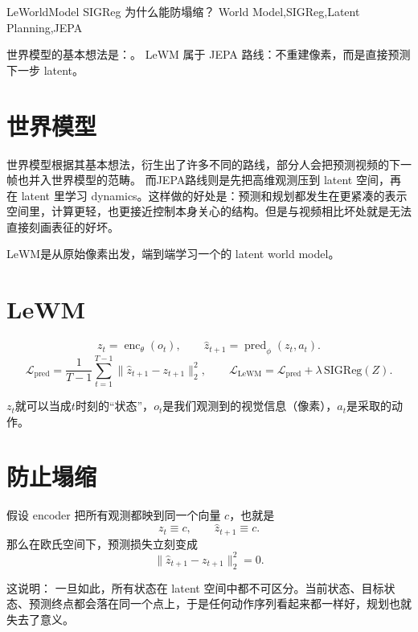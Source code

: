 \documentclass[12pt]{article}
\begin{document}
\MakeShortHeader
  {LeWorldModel}
  {SIGReg 为什么能防塌缩？}
  {World Model,SIGReg,Latent Planning,JEPA}

\begin{KeyBox}
世界模型的基本想法是：。  
LeWM 属于 JEPA 路线：不重建像素，而是直接预测下一步 latent。
\end{KeyBox}

\section*{世界模型}

世界模型根据其基本想法，衍生出了许多不同的路线，部分人会把预测视频的下一帧也并入世界模型的范畴。  
而JEPA路线则是先把高维观测压到 latent 空间，再在 latent 里学习 dynamics。这样做的好处是：预测和规划都发生在更紧凑的表示空间里，计算更轻，也更接近控制本身关心的结构。但是与视频相比坏处就是无法直接刻画表征的好坏。

LeWM是从原始像素出发，端到端学习一个的 latent world model。

\section*{LeWM}

\begin{FormulaBox}[训练目标]
\[
    z_t=\operatorname{enc}_\theta(o_t),
    \qquad
    \hat z_{t+1}=\operatorname{pred}_\phi(z_t,a_t).
\]
\[
    \mathcal L_{\mathrm{pred}}
    = \frac{1}{T-1}\sum_{t=1}^{T-1}
      \lVert \hat z_{t+1}-z_{t+1}\rVert_2^2,
    \qquad
    \mathcal L_{\mathrm{LeWM}}
    = \mathcal L_{\mathrm{pred}}+\lambda\,\mathrm{SIGReg}(Z).
\]
\end{FormulaBox}
 
$z_t$就可以当成$t$时刻的“状态”，$o_t$是我们观测到的视觉信息（像素），$a_t$是采取的动作。

\section*{防止塌缩}

假设 encoder 把所有观测都映到同一个向量 $c$，也就是
\[
    z_t\equiv c,
    \qquad
    \hat z_{t+1}\equiv c.
\]
那么在欧氏空间下，预测损失立刻变成
\[
    \lVert \hat z_{t+1}-z_{t+1}\rVert_2^2=0.
\]

这说明：  
一旦如此，所有状态在 latent 空间中都不可区分。当前状态、目标状态、预测终点都会落在同一个点上，于是任何动作序列看起来都一样好，规划也就失去了意义。
\end{document}
